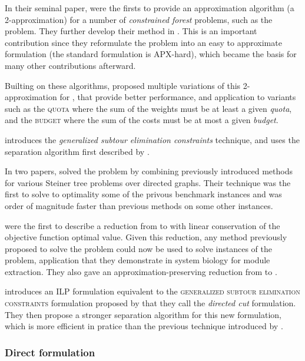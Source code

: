 		In their seminal paper, \textcite{goemans1995general} were the firsts to provide an approximation algorithm (a 2-approximation) for a number of \emph{constrained forest} problems, such as the \pcst{} problem.
		They further develop their method in \parencite{goemans1997primal}.
		This is an important contribution since they reformulate the problem into an easy to approximate formulation (the standard formulation is APX-hard), which became the basis for many other contributions afterward.

		Builting on these algorithms, \textcite{johnson2000prize} proposed multiple variations of this 2-approximation for \pcst{}, that provide better performance, and application to variants such as the \textsc{quota \pcst{}} where the sum of the weights must be at least a given \emph{quota}, and the \textsc{budget \pcst{}} where the sum of the costs must be at most a given \emph{budget}.

		\Textcite{lucena2004strong} introduces the \emph{generalized subtour elimination constraints} technique, and uses the separation algorithm first described by \textcites{fischetti1994weighted}.

		In two papers, \textcites{ljubic2005solving}{ljubic2006algorithmic} solved the \mwcs{} problem by combining previously introduced methods for various Steiner tree problems over directed graphs. Their technique was the first to solve to optimality some of the privous benchmark instances and was order of magnitude faster than previous methods on some other instances.

		\Textcite{dittrich2008identifying} were the first to describe a reduction from \mwcs{} to \pcst{} with linear conservation of the objective function optimal value.
		Given this reduction, any method previously proposed to solve the \pcst{} problem could now be used to solve instances of the \mwcs{} problem, application that they demonstrate in system biology for module extraction.
		They also gave an approximation-preserving reduction from \pcst{} to \mwcs{}.
	
		\Textcite{chimani2009obtaining} introduces an ILP formulation equivalent to the \textsc{generalized subtour elimination constraints} formulation proposed by \textcite{lucena2004strong} that they call the \emph{directed cut} formulation.
		They then propose a stronger separation algorithm for this new formulation, which is more efficient in pratice than the previous technique introduced by \textcites{fischetti1994weighted}.

	\subsubsection{Direct formulation}

